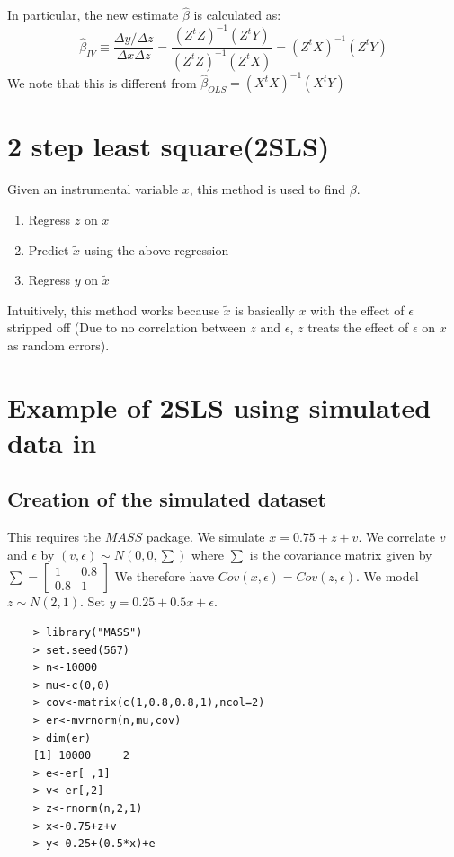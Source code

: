 \documentclass[notoc]{tufte-book}
\begin{document}
In particular, the new estimate $\hat{\beta}$ is calculated as:
$$\hat\beta_{IV}\equiv \frac{\Delta y/\Delta z}{\Delta x\Delta z}=\frac{(Z^tZ)^{-1}(Z^tY)}{(Z^tZ)^{-1}(Z^tX)}=(Z^tX)^{-1}(Z^tY)$$
We note that this is different from $\hat\beta_{OLS}=(X^tX)^{-1}(X^tY)$
\section{2 step least square(2SLS)}
Given an instrumental variable $x$, this method is used to find $\beta$.
\begin{enumerate}
    \item Regress $z$ on $x$
    \item Predict $\tilde x$ using the above regression
    \item Regress $y$ on $\tilde x$  
\end{enumerate}
Intuitively, this method works because $\tilde x$ is basically $x$ with the effect of $\epsilon$ stripped off (Due to no correlation between $z$ and $\epsilon$, $z$ treats the effect of $\epsilon$ on $x$ as random errors).
\section{Example of 2SLS using simulated data in }
\subsection{Creation of the simulated dataset}
This requires the $MASS$ package. We simulate $x=0.75+z+v$. We correlate $v$ and $\epsilon$ by $(v,\epsilon)\sim N(0,0,\sum)$ where $\sum$ is the covariance matrix given by $\sum=\begin{bmatrix}
1 &0.8\\
0.8 &1 
\end{bmatrix}$ We therefore have $Cov(x,\epsilon)=Cov(z,\epsilon)$. We model $z\sim N(2,1)$. Set $y=0.25+0.5x+\epsilon$. 
\begin{lstlisting}
    > library("MASS")
    > set.seed(567)
    > n<-10000
    > mu<-c(0,0)
    > cov<-matrix(c(1,0.8,0.8,1),ncol=2)
    > er<-mvrnorm(n,mu,cov)
    > dim(er)
    [1] 10000     2
    > e<-er[ ,1]
    > v<-er[,2]
    > z<-rnorm(n,2,1)
    > x<-0.75+z+v
    > y<-0.25+(0.5*x)+e
\end{lstlisting}
\end{document}
